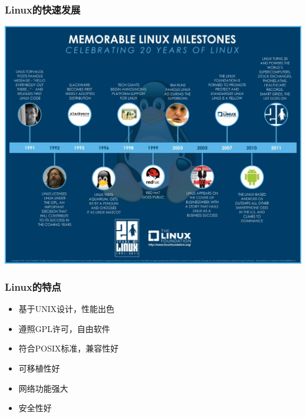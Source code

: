 \documentclass[xcolor=svgnames,bigger,presentation]{beamer}
\begin{document}
\begin{frame}
\frametitle{Linux的快速发展}
\label{sec-2-3-3}

\begin{center}
\includegraphics[width=.9\linewidth]{img/20year.jpg}
\end{center}
\end{frame}
\begin{frame}
\frametitle{Linux的特点}
\label{sec-2-3-4}
\begin{itemize}

\item 基于UNIX设计，性能出色
\label{sec-2-3-4-1}%

\item 遵照GPL许可，自由软件
\label{sec-2-3-4-2}%

\item 符合POSIX标准，兼容性好
\label{sec-2-3-4-3}%

\item 可移植性好
\label{sec-2-3-4-4}%

\item 网络功能强大
\label{sec-2-3-4-5}%

\item 安全性好
\label{sec-2-3-4-6}%
\end{itemize} %
\end{frame}
\end{document}
